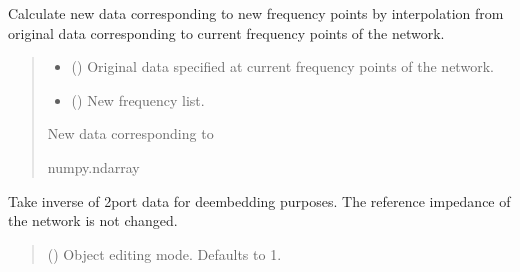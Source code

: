 \documentclass[letterpaper,10pt,english]{sphinxmanual}
\begin{document}
\begin{fulllineitems}
\begin{fulllineitems}
\label{\detokenize{touchstone:touchstone.spfile.interpolate_data}}
\pysigstartsignatures
{}
\pysigstopsignatures
\sphinxAtStartPar
Calculate new data corresponding to new frequency points  by interpolation from original data corresponding to current frequency points of the network.
\begin{quote}\begin{description}
\begin{itemize}
\item {} 
\sphinxAtStartPar
{} () \textendash{} Original data specified at current frequency points of the network.

\item {} 
\sphinxAtStartPar
{} () \textendash{} New frequency list.

\end{itemize}

\sphinxAtStartPar
New data corresponding to 

\sphinxAtStartPar
numpy.ndarray

\end{description}\end{quote}

\end{fulllineitems}


\begin{fulllineitems}
\label{\detokenize{touchstone:touchstone.spfile.inverse_2port}}
\pysigstartsignatures
{}
\pysigstopsignatures
\sphinxAtStartPar
Take inverse of 2\sphinxhyphen{}port data for de\sphinxhyphen{}embedding purposes. The reference impedance of the network is not changed.
\begin{quote}\begin{description}
\sphinxAtStartPar
{} (\sphinxstyleliteralemphasis{\sphinxupquote{, }}) \textendash{} Object editing mode. Defaults to \sphinxhyphen{}1.


\end{description}
\end{quote}
\end{fulllineitems}
\end{fulllineitems}
\end{document}
